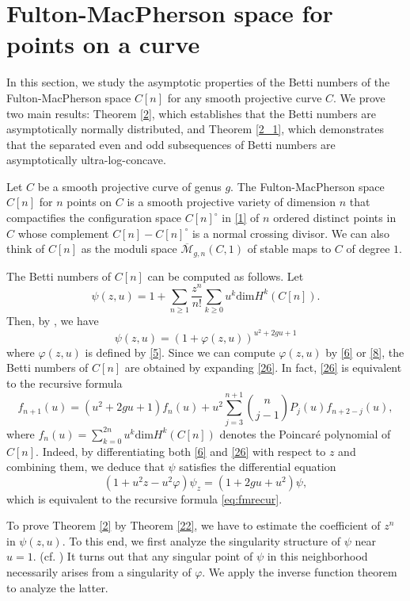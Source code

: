 \documentclass[11pt,letterpaper]{amsart}
\numberwithin{equation}{section}
\theoremstyle{definition}
\newcommand{\cal}{\mathcal}
\def\cM{{\cal M}}
\def\ocM{\overline{\cM}}
\def\mzno{\overline{\cM}_{0,n+1} }
\def\dim{\mathrm{dim} }
\def\beq{\begin{equation}}
\def\eeq{\end{equation}}
\begin{document}
\bigskip
\section{Fulton-MacPherson space for points on a curve}\label{S4}

In this section, we study the asymptotic properties of the Betti numbers of the Fulton-MacPherson space $C[n]$ for any smooth projective curve $C$. We prove two main results: Theorem \ref{2}, which establishes that the Betti numbers are asymptotically normally distributed, and Theorem \ref{2_1}, which demonstrates that the separated even and odd subsequences of Betti numbers are asymptotically ultra-log-concave.

\medskip

Let $C$ be a smooth projective curve of genus $g$. The Fulton-MacPherson space $C[n]$ for $n$ points on $C$ is a smooth projective variety of dimension $n$ that
compactifies the configuration space $C[n]^\circ$ in \eqref{1} of $n$ ordered distinct points in $C$ whose complement $C[n]-C[n]^\circ$ is a normal crossing divisor.
We can also think of $C[n]$ as the moduli space $\ocM_{g,n}(C,1)$ of stable maps to $C$ of degree $1$.

The Betti numbers of $C[n]$ can be computed as follows. Let
\[\psi(z, u) = 1+ \sum_{n\ge 1} \frac{z^n}{n!}\sum_{k\ge 0} u^k \dim H^k(C[n]).  \]
Then, by \cite[Theorem IV.4.3.1]{Manin}, we have
\beq\label{26}
\psi(z, u) = \left( 1+\varphi (z, u)\right)^{u^2+2g u +1} \eeq
where $\varphi(z,u)$ is defined by \eqref{5}. Since we can compute $\varphi(z,u)$ by \eqref{6} or \eqref{8}, the Betti numbers of $C[n]$ are obtained by expanding \eqref{26}. In fact, \eqref{26} is equivalent to the recursive formula
\beq\label{eq:fmrecur} f_{n+1}(u) = (u^2 + 2gu + 1) f_{n}(u) + u^2 \sum_{j=3}^{n+1} \binom{n}{j-1} P_{j}(u) f_{n+2-j}(u),\eeq
where $f_n(u) = \sum_{k= 0}^{2n} u^k \dim H^k(C[n])$ denotes the Poincar\'e polynomial of $C[n]$. Indeed, by differentiating both \eqref{6} and \eqref{26} with respect to $z$ and combining them, we deduce that $\psi$ satisfies the differential equation
\[ (1+u^2z -u^2\varphi) \psi_z =(1+2gu +u^2 )\psi,  \]
which is equivalent to the recursive formula \eqref{eq:fmrecur}.

To prove Theorem \ref{2} by Theorem \ref{22}, we have to estimate the coefficient of $z^n$ in $\psi(z,u)$. To this end, we first analyze the singularity structure of $\psi$ near $u=1$. (cf. \cite[Section IX.5]{FS}) It turns out that any singular point of $\psi$ in this neighborhood necessarily arises from a singularity of $\varphi$. We apply the inverse function theorem to analyze the latter.
\end{document}
